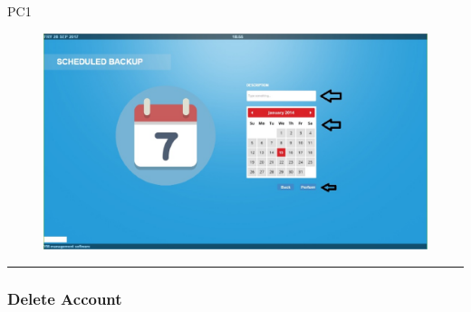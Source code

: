\begin{lyxlist}{PC1}
\begin{figure}[H]
\centering
\includegraphics[width=170mm]{images/schback4.eps}
\caption{\label{overflow}}
\end{figure}

\end{lyxlist}
\hrule
\vspace{0.5cm}


\subsubsection{Delete Account}

